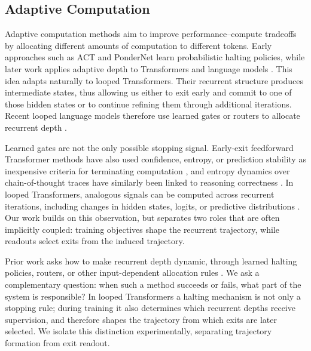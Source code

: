 \documentclass[10pt]{article} %
\begin{document}
\subsection{Adaptive Computation}

Adaptive computation methods aim to improve performance--compute tradeoffs by allocating different amounts of computation to different tokens. Early approaches such as ACT \citep{adaptivecomputationtimerecurrent} and PonderNet \citep{pondernet} learn probabilistic halting policies, while later work applies adaptive depth to Transformers and language models \citep{dynabertdynamicbertadaptive,depthadaptivetransformer,SwitchTS,bae-etal-2023-fast,Elhoushi_2024,mixtureofdepthsdynamicallyallocatingcompute}. This idea adapts naturally to looped Transformers. Their recurrent structure produces intermediate states, thus allowing us either to exit early and commit to one of those hidden states or to continue refining them through additional iterations. Recent looped language models therefore use learned gates or routers to allocate recurrent depth \citep{UT,Ouro,adaponderlm,MoR}.

Learned gates are not the only possible stopping signal. Early-exit feedforward Transformer methods have also used confidence, entropy, or prediction stability as inexpensive criteria for terminating computation \citep{confidentadaptivelanguagemodeling,deebert,zhou2020bertlosespatiencefast}, and entropy dynamics over chain-of-thought traces have similarly been linked to reasoning correctness \citep{sia}. In looped Transformers, analogous signals can be computed across recurrent iterations, including changes in hidden states, logits, or predictive distributions \citep{Huginn}. Our work builds on this observation, but separates two roles that are often implicitly coupled: training objectives shape the recurrent trajectory, while readouts select exits from the induced trajectory.

Prior work asks how to make recurrent depth dynamic, through learned halting policies, routers, or other input-dependent allocation rules \citep{Huginn,Ouro,adaponderlm,MoR}. We ask a complementary question: when such a method succeeds or fails, what part of the system is responsible? In looped Transformers a halting mechanism is not only a stopping rule; during training it also determines which recurrent depths receive supervision, and therefore shapes the trajectory from which exits are later selected. We isolate this distinction experimentally, separating trajectory formation from exit readout.
\end{document}
